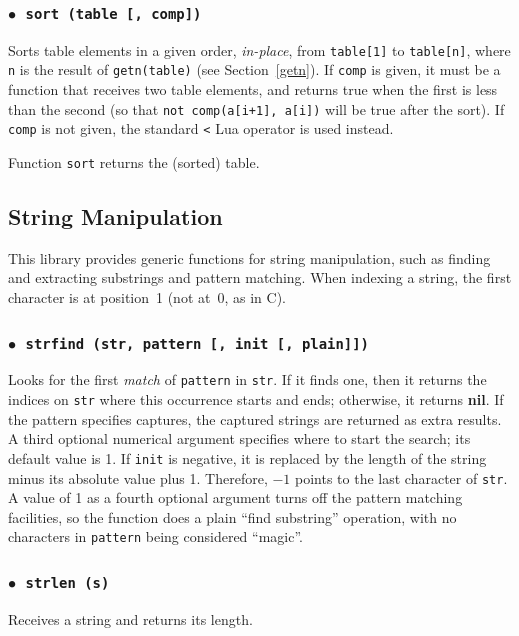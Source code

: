 \documentclass[11pt]{article}
\newcommand{\See}[1]{Section~\ref{#1}}
\newcommand{\see}[1]{(see \See{#1})}
\newcommand{\T}[1]{{\tt #1}}
\newcommand{\Math}[1]{$#1$}
\newcommand{\nil}{{\bf nil}}
\newcommand{\Deffunc}[1]{\index{#1}}
\newcommand{\ff}{$\bullet$\ }
\begin{document}
\subsubsection*{\ff \T{sort (table [, comp])}}\Deffunc{sort}
Sorts table elements in a given order, \emph{in-place},
from \verb|table[1]| to \verb|table[n]|,
where \verb|n| is the result of \verb|getn(table)| \see{getn}.
If \verb|comp| is given,
it must be a function that receives two table elements,
and returns true when the first is less than the second
(so that \verb|not comp(a[i+1], a[i])| will be true after the sort).
If \verb|comp| is not given,
the standard \verb|<| Lua operator is used instead.

Function \verb|sort| returns the (sorted) table.


\subsection{String Manipulation}
This library provides generic functions for string manipulation,
such as finding and extracting substrings and pattern matching.
When indexing a string, the first character is at position~1
(not at~0, as in C).

\subsubsection*{\ff \T{strfind (str, pattern [, init [, plain]])}}
\Deffunc{strfind}
Looks for the first \emph{match} of
\verb|pattern| in \verb|str|.
If it finds one, then it returns the indices on \verb|str|
where this occurrence starts and ends;
otherwise, it returns \nil.
If the pattern specifies captures,
the captured strings are returned as extra results.
A third optional numerical argument specifies where to start the search;
its default value is 1.
If \verb|init| is negative,
it is replaced by the length of the string minus its
absolute value plus 1.
Therefore, \Math{-1} points to the last character of \verb|str|.
A value of 1 as a fourth optional argument
turns off the pattern matching facilities,
so the function does a plain ``find substring'' operation,
with no characters in \verb|pattern| being considered ``magic''.

\subsubsection*{\ff \T{strlen (s)}}\Deffunc{strlen}
Receives a string and returns its length.
\end{document}
